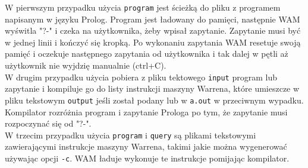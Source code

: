 W pierwszym przypadku użycia \texttt{program} jest ścieżką do pliku z programem napisanym w języku Prolog. Program jest ładowany do pamięci, następnie WAM wyświtla "?-" i czeka na użytkownika, żeby wpisał zapytanie. Zapytanie musi być w jednej linii i kończyć się kropką. Po wykonaniu zapytania WAM resetuje swoją pamięć i oczekuje następnego zapytania od użytkownika i tak dalej w pętli aż użytkownik nie wyjdzię manualnie (ctrl+C).\\
W drugim przypadku użycia pobiera z pliku tektowego \texttt{input} program lub zapytanie i kompiluje go do listy instrukcji maszyny Warrena, które umieszcze w pliku tekstowym \texttt{output} jeśli został podany lub w \texttt{a.out} w przeciwnym wypadku. Kompilator rozróżnia program i zapytanie Prologa po tym, że zapytanie musi rozpoczynać się od "?-".\\
W trzecim przypadku użycia \texttt{program} i \texttt{query} są plikami tekstowymi zawierającymi instrukcje maszyny Warrena, takimi jakie można wygenerować używając opcji \texttt{-c}. WAM ładuje wykonuje te instrukcje pomijając kompilator.\\

